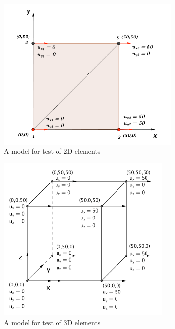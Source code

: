 \begin{figure}
	\begin{center}
		\includegraphics[width=9cm,clip]{PatchMuster.pdf} 			
		\caption{A model for test of 2D elements} \label{fig: PatchMuster}
	\end{center}
\end{figure}

\begin{figure}
	\begin{center}
		\includegraphics[width=8.5cm,clip]{UnitTest3D.png} 			
		\caption{A model for test of 3D elements} \label{fig: UnitTest3D}
	\end{center}
\end{figure}

